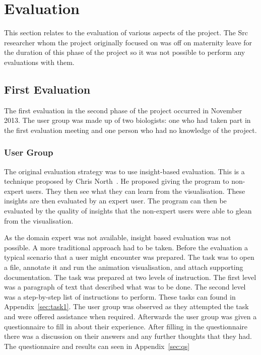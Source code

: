 \chapter{Evaluation}
\label{chap:eval}

This section relates to the evaluation of various aspects of the project.  The Src researcher whom the project originally focused on was off on maternity leave for the duration of this phase of the project so it was not possible to perform any evaluations with them.

\section{First Evaluation}
\label{sec:eval1}

The first evaluation in the second phase of the project occurred in November 2013.  The user group was made up of two biologists:  one who had taken part in the first evaluation meeting and one person who had no knowledge of the project.

\subsection{User Group}

The original evaluation strategy was to use insight-based evaluation.  This is a technique proposed by Chris North~\cite{cn_vizbi}.  He proposed giving the program to non-expert users.  They then see what they can learn from the visualisation.  These insights are then evaluated by an expert user.  The program can then be evaluated by the quality of insights that the non-expert users were able to glean from the visualisation.

As the domain expert was not available, insight based evaluation was not possible.  A more traditional approach had to be taken.  Before the evaluation  a typical scenario that a user might encounter was prepared.  The task was to open a file, annotate it and run the animation visualisation, and attach supporting documentation.  The task was prepared at two levels of instruction.  The first level was a paragraph of text that described what was to be done.  The second level was a step-by-step list of instructions to perform.  These tasks can found in Appendix~\ref{sec:task1}.  The user group was observed as they attempted the task and were offered assistance when required.  Afterwards the user group was given a questionnaire to fill in about their experience. After filling in the questionnaire there was a discussion on their answers and any further thoughts that they had.  The questionnaire and results can seen in Appendix~\ref{sec:qs}

